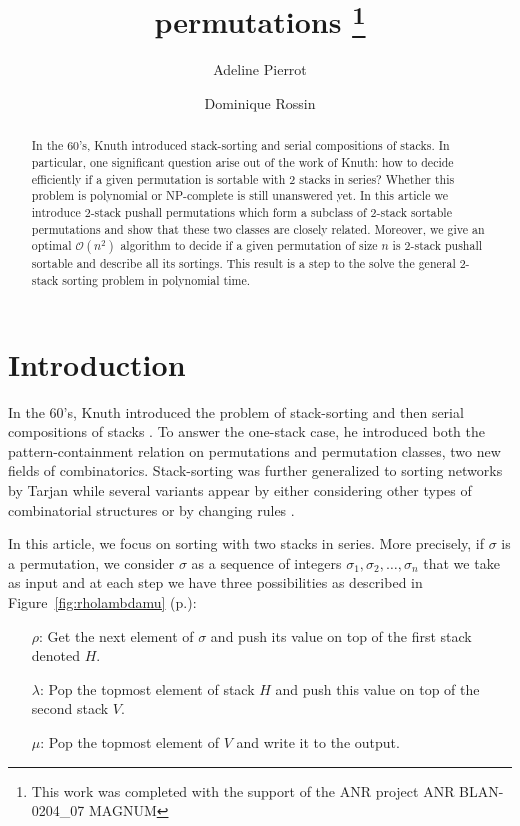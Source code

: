 \documentclass[11pt]{article}
\title{\pushall permutations \footnote{This work was completed with the support of the ANR
   project ANR BLAN-0204\_07  MAGNUM}}
\author{Adeline Pierrot \and Dominique Rossin}
\newcommand{\pushall}{$2$-stack pushall sortable\xspace}
\begin{document}
\maketitle
\begin{abstract}
In the 60's, Knuth introduced stack-sorting and serial compositions of stacks.
In particular, one significant question arise out of the work of Knuth: 
how to decide efficiently if a given permutation is sortable with $2$ stacks in series?
Whether this problem is polynomial or \mbox{NP-complete} is still unanswered yet.
In this article we introduce $2$-stack pushall permutations which form a subclass of $2$-stack sortable permutations 
and show that these two classes are closely related. 
Moreover, we give an optimal ${\mathcal O}(n^{2})$ algorithm to decide if a given permutation of size $n$ is \pushall and describe all its sortings.
This result is a step to the solve the general $2$-stack sorting problem in polynomial time.
\end{abstract}

\section{Introduction}

In the 60's, Knuth introduced the problem of stack-sorting \cite{Knuth68} and 
then serial compositions of stacks \cite{Knuth73}.
To answer the one-stack case, he introduced both the pattern-containment relation on permutations and permutation classes, two new fields of combinatorics. 
Stack-sorting was further generalized to sorting networks by Tarjan \cite{Tarjan72}
while several variants appear by either considering other types of combinatorial structures or by changing rules \cite{Pratt73,EvenItai71,AAL10}.

In this article, we focus on sorting with two stacks in series. 
More precisely, if $\sigma$ is a permutation, we consider $\sigma$ as a sequence of integers $\sigma_1,\sigma_2,\ldots,\sigma_n$ that we take as input
and at each step we have three possibilities as described in Figure~\ref{fig:rholambdamu} (p.\pageref{fig:rholambdamu}):
\begin{enumerate}
\item[$\rho$:] Get the next element of $\sigma$ and push its value on top of the first stack denoted $H$.
\item[$\lambda$:] Pop the topmost element of stack $H$ and push this value on top of the second stack $V$.
\item[$\mu$:] Pop the topmost element of $V$ and write it to the output.
\end{enumerate}
\end{document}
